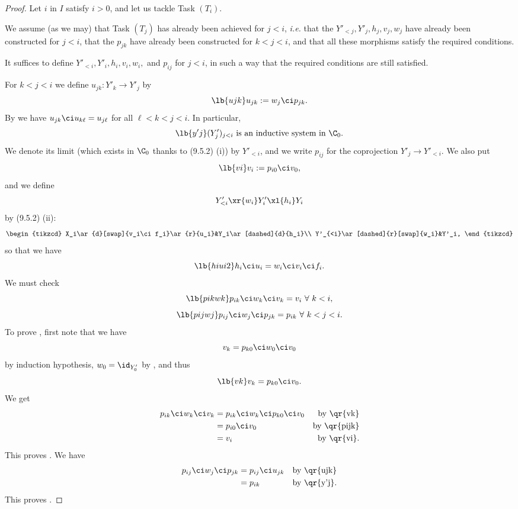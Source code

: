 \documentclass[12pt]{article}
\theoremstyle{remark}
\theoremstyle{definition}
\begin{document}
\begin{proof}
Let $i$ in $I$ satisfy $i>0$, and let us tackle Task $(T_i)$. 

We assume (as we may) that Task $(T_j)$ has already been achieved for $j<i$, {\em i.e.} that the $Y'_{<j},Y'_j,h_j,v_j,w_j$ have already been constructed for $j<i$, that the $p_{jk}$ have already been constructed for $k<j<i$, and that all these morphisms satisfy the required conditions. 

It suffices to define $Y'_{<i},Y'_i,h_i,v_i,w_i,$ and $p_{ij}$ for $j<i$, in such a way that the required conditions are still satisfied. 

For $k<j<i$ we define $u_{jk}:Y'_k\to Y'_j$ by
%
\begin{equation}\lb{ujk}
u_{jk}:=w_j\ci p_{jk}.
\end{equation}
%
By  we have $u_{jk}\ci u_{k\ell}=u_{j\ell}$ for all $\ell<k<j<i$. In particular, 
%
\begin{equation}\lb{y'j}
(Y'_j)_{j<i}\text{ is an inductive system in }\C_0.
\end{equation}
%
We denote its limit (which exists in $\C_0$ thanks to (9.5.2) (i)) by $Y'_{<i}$, and we write $p_{ij}$ for the coprojection $Y'_j\to Y'_{<i}$. We also put
%
\begin{equation}\lb{vi}
v_i:=p_{i0}\ci v_0,
\end{equation}
%
and we define
$$
Y'_{<i}\xr{w_i}Y'_i\xl{h_i}Y_i
$$
by (9.5.2) (ii):
$$
\begin{tikzcd}
X_i\ar{d}[swap]{v_i\ci f_i}\ar{r}{u_i}&Y_i\ar[dashed]{d}{h_i}\\
Y'_{<i}\ar[dashed]{r}[swap]{w_i}&Y'_i,
\end{tikzcd}
$$
so that we have  
%
\begin{equation}\lb{hiui2}
h_i\ci u_i=w_i\ci v_i\ci f_i. 
\end{equation} 
%
We must check 
%
\begin{equation}\lb{pikwk}
p_{ik}\ci w_k\ci v_k=v_i\ \forall\ k<i,
\end{equation}
%
\begin{equation}\lb{pijwj}
p_{ij}\ci w_j\ci p_{jk}=p_{ik}\ \forall\ k<j<i.
\end{equation} 
%
To prove , first note that we have 
$$v_k=p_{k0}\ci w_0\ci v_0
$$ 
by induction hypothesis, $w_0=\id_{Y'_0}$ by , and thus 
%
\begin{equation}\lb{vk}
v_k=p_{k0}\ci v_0.
\end{equation}
%
We get 
% 
\begin{align*}
p_{ik}\ci w_k\ci v_k&=p_{ik}\ci w_k\ci p_{k0}\ci v_0&\text{by \qr{vk}}\\ 
&=p_{i0}\ci v_0&\text{by \qr{pijk}}\\ 
&=v_i&\text{by \qr{vi}}.
\end{align*}
%
This proves . We have 
% 
\begin{align*}
p_{ij}\ci w_j\ci p_{jk}&=p_{ij}\ci u_{jk}&\text{by \qr{ujk}}\\ 
&=p_{ik}&\text{by \qr{y'j}}.
\end{align*}
%
This proves . 


\end{proof}
\end{document}
